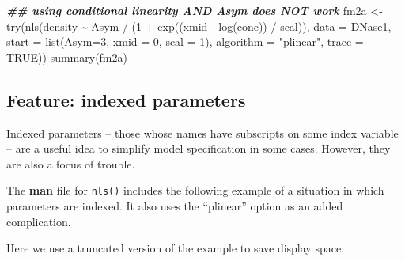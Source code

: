 \documentclass[
]{article}
\newenvironment{Shaded}{\begin{snugshade}}{\end{snugshade}}
\newcommand{\AttributeTok}[1]{\textcolor[rgb]{0.77,0.63,0.00}{#1}}
\newcommand{\ConstantTok}[1]{\textcolor[rgb]{0.00,0.00,0.00}{#1}}
\newcommand{\DecValTok}[1]{\textcolor[rgb]{0.00,0.00,0.81}{#1}}
\newcommand{\DocumentationTok}[1]{\textcolor[rgb]{0.56,0.35,0.01}{\textbf{\textit{#1}}}}
\newcommand{\FunctionTok}[1]{\textcolor[rgb]{0.00,0.00,0.00}{#1}}
\newcommand{\NormalTok}[1]{#1}
\newcommand{\OtherTok}[1]{\textcolor[rgb]{0.56,0.35,0.01}{#1}}
\newcommand{\SpecialCharTok}[1]{\textcolor[rgb]{0.00,0.00,0.00}{#1}}
\newcommand{\StringTok}[1]{\textcolor[rgb]{0.31,0.60,0.02}{#1}}
\begin{document}
\begin{Shaded}
\begin{Highlighting}[]
\DocumentationTok{\#\# using conditional linearity AND Asym does NOT work}
\NormalTok{fm2a }\OtherTok{\textless{}{-}} \FunctionTok{try}\NormalTok{(}\FunctionTok{nls}\NormalTok{(density }\SpecialCharTok{\textasciitilde{}}\NormalTok{ Asym }\SpecialCharTok{/}\NormalTok{ (}\DecValTok{1} \SpecialCharTok{+} \FunctionTok{exp}\NormalTok{((xmid }\SpecialCharTok{{-}} \FunctionTok{log}\NormalTok{(conc)) }\SpecialCharTok{/}\NormalTok{ scal)), }
                 \AttributeTok{data =}\NormalTok{ DNase1, }\AttributeTok{start =} \FunctionTok{list}\NormalTok{(}\AttributeTok{Asym=}\DecValTok{3}\NormalTok{, }\AttributeTok{xmid =} \DecValTok{0}\NormalTok{, }\AttributeTok{scal =} \DecValTok{1}\NormalTok{),}
                 \AttributeTok{algorithm =} \StringTok{"plinear"}\NormalTok{, }\AttributeTok{trace =} \ConstantTok{TRUE}\NormalTok{))}
\FunctionTok{summary}\NormalTok{(fm2a)}
\end{Highlighting}
\end{Shaded}

\hypertarget{feature-indexed-parameters}{%
\subsection{Feature: indexed
parameters}\label{feature-indexed-parameters}}

Indexed parameters -- those whose names have subscripts on some index
variable -- are a useful idea to simplify model specification in some
cases. However, they are also a focus of trouble.

The \textbf{man} file for \texttt{nls()} includes the following example
of a situation in which parameters are indexed. It also uses the
``plinear'' option as an added complication.

Here we use a truncated version of the example to save display space.
\end{document}
